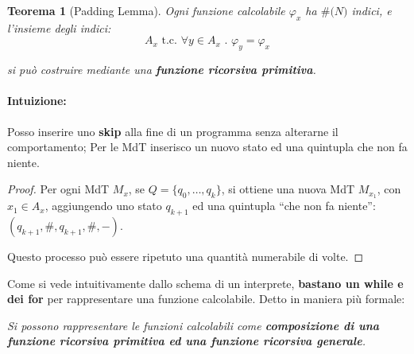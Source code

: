 \documentclass[a4paper,10pt,oneside]{article}
\theoremstyle{break}
\newtheorem{teo}{Teorema}[subsection]
\begin{document}
\begin{mdframed}
\begin{teo}[Padding Lemma]
 Ogni funzione calcolabile $\varphi_x$ ha $\#\mathbb (N)$ indici, e l'insieme degli indici:
 \[ A_x \text{ t.c. } \forall y \in A_x \,\,.\,\, \varphi_y = \varphi_x \]

 si può costruire mediante una \textbf{funzione ricorsiva primitiva}.
\end{teo}
\dotfill
\paragraph{Intuizione:} Posso inserire uno \textbf{skip} alla fine di un programma senza alterarne il comportamento; Per le MdT inserisco un nuovo stato ed una quintupla che non fa niente.

\dotfill
\begin{proof}
 Per ogni MdT $M_x$, se $Q = \{ q_0, \hdots, q_k\}$, si ottiene una nuova MdT $M_{x_1}$, con $x_1 \in A_x$, aggiungendo uno stato $q_{k+1}$ ed una quintupla ``che non fa niente'': $(q_{k+1}, \#, q_{k+1}, \#, -)$.\smallskip


 Questo processo può essere ripetuto una quantità numerabile di volte.
\end{proof}

\end{mdframed}

\newpage

Come si vede intuitivamente dallo schema di un interprete, \textbf{bastano un while e dei for} per rappresentare una funzione calcolabile. Detto in maniera più formale:

\begin{center}
 \it Si possono rappresentare le funzioni calcolabili come \textbf{composizione di una funzione ricorsiva primitiva ed una funzione ricorsiva generale}.
\end{center}
\end{document}
